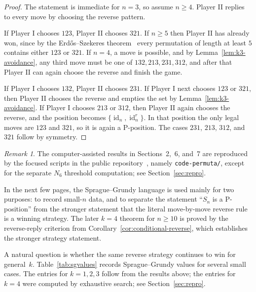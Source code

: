 \documentclass[11pt]{amsart}
\newcommand{\Sym}{S}
\newcommand{\id}{\operatorname{id}}
\theoremstyle{plain}
\theoremstyle{definition}
\theoremstyle{remark}
\newtheorem{remark}[theorem]{Remark}
\begin{document}
\begin{proof}
  The statement is immediate for $n=3$, so assume $n \geq 4$.
  Player II replies to every move by choosing the reverse pattern.

  If Player I chooses $123$, Player II chooses $321$. If $n \geq 5$ then Player II has already won, since by the
  Erd\H{o}s--Szekeres theorem~\cite{erdos-szekeres} every permutation of length at least $5$ contains either $123$ or $321$.  If $n=4$, a move is possible, and
  by Lemma~\ref{lem:k3-avoidance}, any third move
  must be one of $132,213,231,312$, and after that Player II can again choose the reverse and finish
  the game.

  If Player I chooses $132$, Player II chooses $231$.  If Player I next chooses $123$ or $321$, then
  Player II chooses the reverse and empties the set by Lemma~\ref{lem:k3-avoidance}.  If Player I
  chooses $213$ or $312$, then Player II again chooses the reverse, and the position becomes
  $\{\id_n,\id_n^r\}$.  In that position the only legal moves are $123$ and $321$, so it is again a
  P-position.  The cases $231$, $213$, $312$, and $321$ follow by symmetry.
\end{proof}

\begin{remark}
  The computer-assisted results in Sections~2,~6, and~7 are reproduced by the focused scripts
  in the public repository~\cite{game-patterns-repo}, namely \texttt{code-permuta/}, except for the
  separate $N_6$ threshold computation; see
  Section~\ref{sec:repro}.
\end{remark}

In the next few pages, the Sprague--Grundy language is used mainly for two purposes: to record
small-$n$ data, and to separate the statement ``$\Sym_n$ is a P-position'' from the stronger
statement that the literal move-by-move reverse rule is a winning strategy. The later $k=4$ theorem for $n \geq 10$ is proved by the
reverse-reply criterion from Corollary~\ref{cor:conditional-reverse}, which establishes the stronger
strategy statement.

A natural question is whether the same reverse strategy continues to win for general~$k$.
Table~\ref{tab:sgvalues} records Sprague--Grundy values for several small
cases.  The entries for $k=1,2,3$ follow from the results above; the entries for $k=4$ were
computed by exhaustive search; see Section~\ref{sec:repro}.
\end{document}
